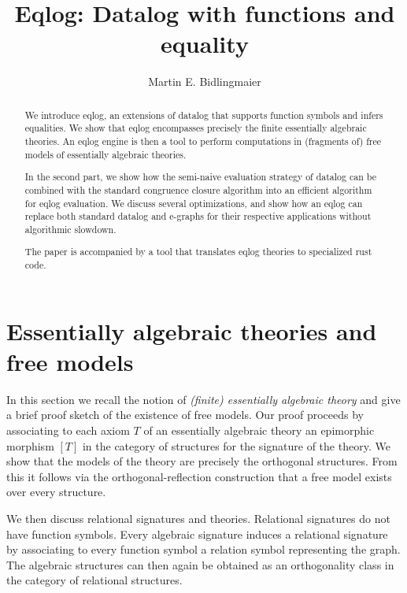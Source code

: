 \documentclass[a4paper]{article}
\theoremstyle{remark}
\theoremstyle{definition}
\begin{document}
\title{Eqlog: Datalog with functions and equality}

\author{Martin E. Bidlingmaier}

\date{}

\maketitle

\begin{abstract}
  We introduce eqlog, an extensions of datalog that supports function symbols and infers equalities.
  We show that eqlog encompasses precisely the finite essentially algebraic theories.
  An eqlog engine is then a tool to perform computations in (fragments of) free models of essentially algebraic theories.

  In the second part, we show how the semi-naive evaluation strategy of datalog can be combined with the standard congruence closure algorithm into an efficient algorithm for eqlog evaluation.
  We discuss several optimizations, and show how an eqlog can replace both standard datalog and e-graphs for their respective applications without algorithmic slowdown.

  The paper is accompanied by a tool that translates eqlog theories to specialized rust code.
\end{abstract}

\section{Essentially algebraic theories and free models}

In this section we recall the notion of \emph{(finite) essentially algebraic theory} and give a brief proof sketch of the existence of free models.
Our proof proceeds by associating to each axiom $T$ of an essentially algebraic theory an epimorphic morphism $[T]$ in the category of structures for the signature of the theory.
We show that the models of the theory are precisely the orthogonal structures.
From this it follows via the orthogonal-reflection construction that a free model exists over every structure.

We then discuss relational signatures and theories.
Relational signatures do not have function symbols.
Every algebraic signature induces a relational signature by associating to every function symbol a relation symbol representing the graph.
The algebraic structures can then again be obtained as an orthogonality class in the category of relational structures.
\end{document}
